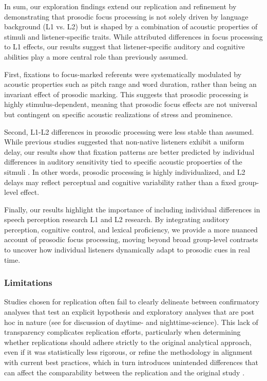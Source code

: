 In sum, our exploration findings extend our replication and refinement by demonstrating that prosodic focus processing is not solely driven by language background (L1 vs. L2) but is shaped by a combination of acoustic properties of stimuli and listener-specific traits. While \citep{Ge2021} attributed differences in focus processing to L1 effects, our results suggest that listener-specific auditory and cognitive abilities play a more central role than previously assumed.

First, fixations to focus-marked referents were systematically modulated by acoustic properties such as pitch range and word duration, rather than being an invariant effect of prosodic marking. This suggests that prosodic processing is highly stimulus-dependent, meaning that prosodic focus effects are not universal but contingent on specific acoustic realizations of stress and prominence.

Second, L1-L2 differences in prosodic processing were less stable than assumed. While previous studies suggested that non-native listeners exhibit a uniform delay, our results show that fixation patterns are better predicted by individual differences in auditory sensitivity tied to specific acoustic propoerties of the sitmuli \cite{xie2023adaptive}. In other words, prosodic processing is highly individualized, and L2 delays may reflect perceptual and cognitive variability rather than a fixed group-level effect.

Finally, our results highlight the importance of including individual differences in speech perception research L1 and L2 research. By integrating auditory perception, cognitive control, and lexical proficiency, we provide a more nuanced account of prosodic focus processing, moving beyond broad group-level contrasts to uncover how individual listeners dynamically adapt to prosodic cues in real time.


\subsubsection{Limitations}

Studies chosen for replication often fail to clearly delineate between confirmatory analyses that test an explicit hypothesis and exploratory analyses that are post hoc in nature (see \cite{Yanai2020} for discussion of daytime- and nighttime-science). This lack of transparency complicates replication efforts, particularly when determining whether replications should adhere strictly to the original analytical approach, even if it was statistically less rigorous, or refine the methodology in alignment with current best practices, which in turn introduces unintended differences that can affect the comparability between the replication and the original study \cite{mcmanus2022replication}.

